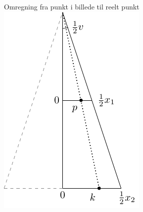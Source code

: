 \begin{frame}{Omregning fra punkt i billede til reelt punkt}
\centering
\includegraphics[scale=1]{conversion_figure}

\end{frame}








